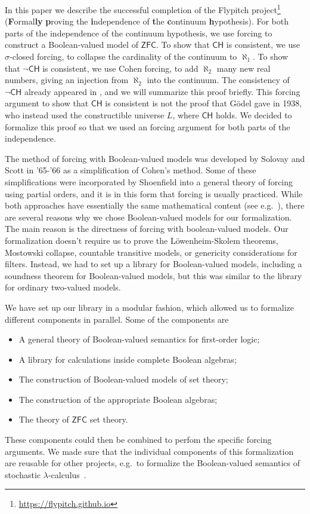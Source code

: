 \documentclass[sigplan,10pt,review, anonymous]{acmart}
\theoremstyle{definition}
\begin{document}
In this paper we describe the successful completion of the Flypitch project\footnote{\url{https://flypitch.github.io}} (\textbf{F}ormal\textbf{ly} \textbf{p}roving the \textbf{i}ndependence of \textbf{t}he \textbf{c}ontinuum \textbf{h}ypothesis).
For both parts of the independence of the continuum hypothesis, we use forcing to construct a Boolean-valued model of $\mathsf{ZFC}$.
To show that $\mathsf{CH}$ is consistent, we use $\sigma$-closed forcing, to collapse the cardinality of the continuum to $\aleph_1$.
To show that $\neg \mathsf{CH}$ is consistent, we use Cohen forcing, to add $\aleph_2$ many new real numbers, giving an injection from $\aleph_2$ into the continuum.
The consistency of $\neg \mathsf{CH}$ already appeared in \cite{DBLP:conf/itp/HanD19}, and we will summarize this proof briefly.
This forcing argument to show that $\mathsf{CH}$ is consistent is not the proof that G\"odel gave in 1938, who instead used the constructible universe $L$, where $\mathsf{CH}$ holds. We decided to formalize this proof so that we used an forcing argument for both parts of the independence.

The method of forcing with Boolean-valued models was developed by Solovay and Scott in '65-'66 \cite{scott1967proof,scott-solovay} as a simplification of Cohen's method.
Some of these simplifications were incorporated by Shoenfield \cite{shoenfield1971unramified} into a general theory of forcing using partial orders, and it is in this form that forcing is usually practiced.
While both approaches have essentially the same mathematical content (see e.g.\ \cite{kunen2014set, jech2013set, moore2019method}), there are several reasons why we chose Boolean-valued models for our formalization.
The main reason is the directness of forcing with boolean-valued models.
Our formalization doesn't require us to prove the L\"owenheim-Skolem theorems, Mostowski collapse, countable transitive models, or genericity considerations for filters.
Instead, we had to set up a library for Boolean-valued models, including a soundness theorem for Boolean-valued models, but this was similar to the library for ordinary two-valued models.

We have set up our library in a modular fashion, which allowed us to formalize different components in parallel. Some of the components are
\begin{itemize}
  \item A general theory of Boolean-valued semantics for first-order logic;
  \item A library for calculations inside complete Boolean algebras;
  \item The construction of Boolean-valued models of set theory;
  \item The construction of the appropriate Boolean algebras;
  \item The theory of \(\mathsf{ZFC}\) set theory.
\end{itemize}
These components could then be combined to perfom the specific forcing arguments.
We made sure that the individual components of this formalization are reusable for other projects, e.g.\ to formalize the Boolean-valued semantics of stochastic $\lambda$-calculus~\cite{scott2014stochastic, bacci2018boolean}.
\end{document}
